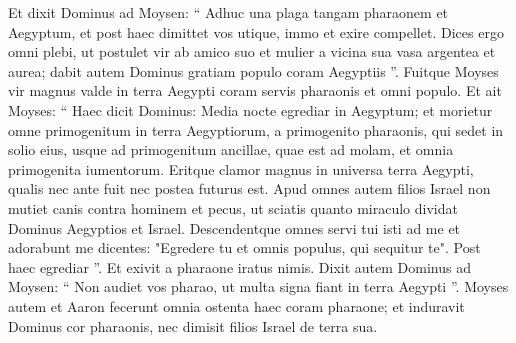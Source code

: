 \begin{biblechapter}
\begin{biblechapter}
\begin{biblechapter}
\begin{biblechapter}
\begin{biblechapter}
\begin{biblechapter}
\begin{biblechapter}
\begin{biblechapter}
\begin{biblechapter}
\begin{biblechapter}
\begin{biblechapter}
\verse Et dixit Dominus ad Moysen: “ Adhuc una plaga tangam pharaonem et Aegyptum, et post haec dimittet vos utique, immo et exire compellet. 
\verse Dices ergo omni plebi, ut postulet vir ab amico suo et mulier a vicina sua vasa argentea et aurea; 
\verse dabit autem Dominus gratiam populo coram Aegyptiis ”. Fuitque Moyses vir magnus valde in terra Aegypti coram servis pharaonis et omni populo.
 \verse Et ait Moyses: “ Haec dicit Dominus: Media nocte egrediar in Aegyptum; 
\verse et morietur omne primogenitum in terra Aegyptiorum, a primogenito pharaonis, qui sedet in solio eius, usque ad primogenitum ancillae, quae est ad molam, et omnia primogenita iumentorum. 
\verse Eritque clamor magnus in universa terra Aegypti, qualis nec ante fuit nec postea futurus est. 
\verse Apud omnes autem filios Israel non mutiet canis contra hominem et pecus, ut sciatis quanto miraculo dividat Dominus Aegyptios et Israel. 
\verse Descendentque omnes servi tui isti ad me et adorabunt me dicentes: "Egredere tu et omnis populus, qui sequitur te". Post haec egrediar ”. Et exivit a pharaone iratus nimis.
 \verse Dixit autem Dominus ad Moysen: “ Non audiet vos pharao, ut multa signa fiant in terra Aegypti ”. 
\verse Moyses autem et Aaron fecerunt omnia ostenta haec coram pharaone; et induravit Dominus cor pharaonis, nec dimisit filios Israel de terra sua.
 

\end{biblechapter}
\end{biblechapter}
\end{biblechapter}
\end{biblechapter}
\end{biblechapter}
\end{biblechapter}
\end{biblechapter}
\end{biblechapter}
\end{biblechapter}
\end{biblechapter}
\end{biblechapter}
